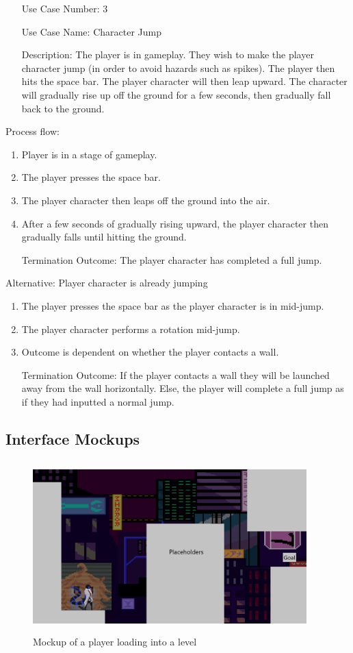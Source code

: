 \documentclass[10pt,conference,onecolumn,compsoc]{IEEEtran}
\begin{document}
\begin{itemize}
\item[Use Case Number:] 3
\item[Use Case Name:] Character Jump
\item[Description:] The player is in gameplay. They wish to make the player character jump (in order to avoid hazards such as spikes). The player then hits the space bar. The player character will then leap upward. The character will gradually rise up off the ground for a few seconds, then gradually fall back to the ground.
\end{itemize}

Process flow:

\begin{enumerate}
\item Player is in a stage of gameplay.
\item The player presses the space bar.
\item The player character then leaps off the ground into the air.
\item After a few seconds of gradually rising upward, the player character then gradually falls until hitting the ground.
\item[Termination Outcome:] The player character has completed a full jump.
\end{enumerate}

Alternative: Player character is already jumping
\begin{enumerate}
\item The player presses the space bar as the player character is in mid-jump.
\item The player character performs a rotation mid-jump.
\item Outcome is dependent on whether the player contacts a wall.
\item[Termination Outcome:] If the player contacts a wall they will be launched away from the wall horizontally. Else, the player will complete a full jump as if they had inputted a normal jump.
\end{enumerate}


\subsection{Interface Mockups}
\begin{figure}[ht!]
\includegraphics[height=250px, width=400px]{Level Mockup.png}
\caption{Mockup of a player loading into a level}
\label{Level Mockup}
\end{figure}
\end{document}
